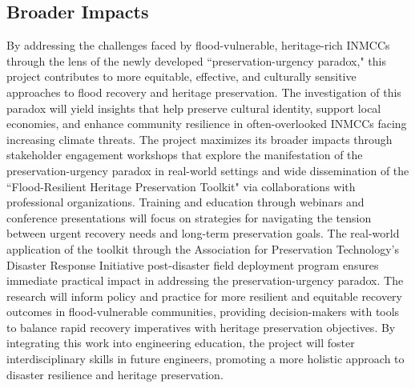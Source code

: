 \documentclass[11pt]{article}
\begin{document}
\subsection{Broader Impacts} 
\vspace{-0.3cm}
By addressing the challenges faced by flood-vulnerable, heritage-rich INMCCs through the lens of the newly developed ``preservation-urgency paradox,"  this project contributes to more equitable, effective, and culturally sensitive approaches to flood recovery and heritage preservation. 
The investigation of this paradox will yield insights that help preserve cultural identity, support local economies, and enhance community resilience in often-overlooked INMCCs facing increasing climate threats. 
The project maximizes its broader impacts through stakeholder engagement workshops that explore the manifestation of the preservation-urgency paradox in real-world settings and wide dissemination of the ``Flood-Resilient Heritage Preservation Toolkit" via collaborations with professional organizations. 
Training and education through webinars and conference presentations will focus on strategies for navigating the tension between urgent recovery needs and long-term preservation goals.
The real-world application of the toolkit through the Association for Preservation Technology's Disaster Response Initiative post-disaster field deployment program ensures immediate practical impact in addressing the preservation-urgency paradox. 
The research will inform policy and practice for more resilient and equitable recovery outcomes in flood-vulnerable communities, providing decision-makers with tools to balance rapid recovery imperatives with heritage preservation objectives. 
By integrating this work into engineering education, the project will foster interdisciplinary skills in future engineers, promoting a more holistic approach to disaster resilience and heritage preservation. 
\end{document}
